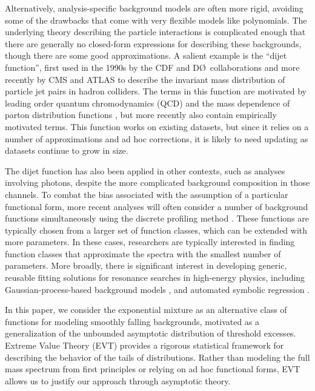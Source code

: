 \documentclass[a4paper,11pt]{article}
\begin{document}
Alternatively, analysis-specific background models are often more rigid, avoiding some of the drawbacks that 
come with very flexible models like polynomials. The underlying theory describing the particle 
interactions is complicated enough that there are generally no closed-form expressions for 
describing these backgrounds, though there are some good approximations. A salient example is 
the ``dijet function'', first used in the 1990s by the CDF and D\O\ collaborations and more 
recently by CMS and ATLAS \cite{Harris:2011bh} to describe the invariant mass distribution of 
particle jet pairs in hadron colliders. The terms in this function are motivated by leading 
order quantum chromodynamics (QCD) and the mass dependence of parton distribution 
functions \cite{Harris:2011bh}, but more recently also contain empirically motivated terms. This function works on existing datasets, but 
since it relies on a number of approximations and ad hoc corrections, it is likely to need 
updating as datasets continue to grow in size.

The dijet function has also been applied in other contexts, such as analyses 
involving photons, despite the more complicated background composition 
in those channels. To combat the bias associated 
with the assumption of a particular functional form, more recent analyses \cite{CMS_DP1, 
CMS_high_mass_diphoton, CMS_DP2, CMS_DP3} will often consider a number of background functions 
simultaneously using the discrete profiling method \cite{discrete-profiling}. These functions 
are typically chosen from a larger set of function classes, which can be extended with more 
parameters. In these cases, researchers are typically interested in finding function classes that 
approximate the spectra with the smallest number of parameters. More broadly, there is significant interest in developing generic, 
reusable fitting solutions for resonance searches in high-energy physics, including 
Gaussian-process-based background models \cite{Frate_2017}, and automated symbolic regression \cite{SymbolFit_2025}.

In this paper, we consider the exponential mixture as an alternative class of functions for modeling 
smoothly falling backgrounds, motivated as a generalization of the unbounded asymptotic 
distribution of threshold excesses. Extreme Value Theory (EVT) provides a rigorous statistical 
framework for describing the behavior of the tails of distributions. Rather than modeling the 
full mass spectrum from first principles or relying on ad hoc functional forms, EVT allows us to 
justify our approach through asymptotic theory.
\end{document}
